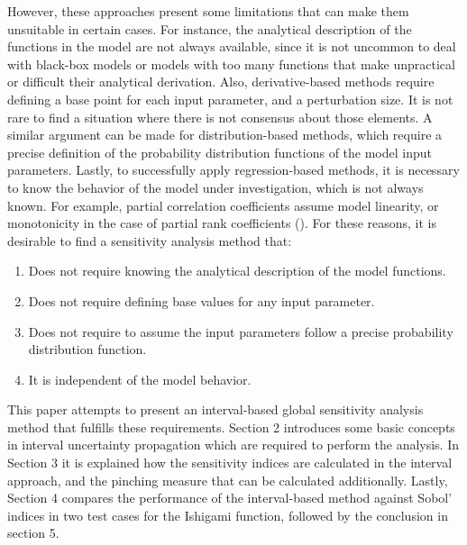 \documentclass[twocolumn]{rps-esrel2022}
\begin{document}
However, these approaches present some limitations that can make them unsuitable in certain cases.
For instance, the analytical description of the functions in the model are not always available, since it is not uncommon to deal with black-box models or
models with too many functions that make unpractical or difficult their analytical derivation.
Also, derivative-based methods require defining a base point for each input parameter, and a perturbation size.
It is not rare to find a situation where there is not consensus about those elements.
A similar argument can be made for distribution-based methods, which require a precise definition of the probability distribution functions of the model input
parameters.
Lastly, to successfully apply regression-based methods, it is necessary to know the behavior of the model under investigation, which is not always known.
For example, partial correlation coefficients assume model linearity, or monotonicity in the case of partial rank coefficients (\cite{saltelli1990non}).
For these reasons, it is desirable to find a sensitivity analysis method that:

\begin{enumerate}
	\item Does not require knowing the analytical description of the model functions.
	\item Does not require defining base values for any input parameter.
	\item Does not require to assume the input parameters follow a precise probability distribution function.
	\item It is independent of the model behavior.
\end{enumerate}

This paper attempts to present an interval-based global sensitivity analysis method that fulfills these requirements.
Section 2 introduces some basic concepts in interval uncertainty propagation which are required to perform the analysis.
In Section 3 it is explained how the sensitivity indices are calculated in the interval approach, and the
pinching measure that can be calculated additionally.
Lastly, Section 4 compares the performance of the interval-based method against Sobol' indices in two test cases for the
Ishigami function, followed by the conclusion in section 5.

\end{document}
